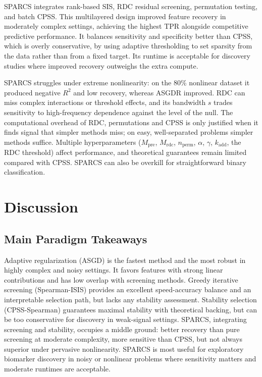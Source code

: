 \documentclass[11pt]{article}
\begin{document}
SPARCS integrates rank-based SIS, RDC residual screening, permutation testing, and batch CPSS. This
multilayered design improved feature recovery in moderately complex settings, achieving the highest
TPR alongside competitive predictive performance. It balances sensitivity and specificity better than
CPSS, which is overly conservative, by using adaptive thresholding to set sparsity from the data
rather than from a fixed target. Its runtime is acceptable for discovery studies where improved
recovery outweighs the extra compute.

SPARCS struggles under extreme nonlinearity: on the 80\% nonlinear dataset it produced negative $R^2$
and low recovery, whereas ASGDR improved. RDC can miss complex interactions or threshold effects, and
its bandwidth $s$ trades sensitivity to high-frequency dependence against the level of the null. The
computational overhead of RDC, permutations and CPSS is only justified when it finds signal that
simpler methods miss; on easy, well-separated problems simpler methods suffice. Multiple
hyperparameters ($M_{\mathrm{pre}}$, $M_{\mathrm{rdc}}$, $n_{\mathrm{perm}}$, $\alpha$, $\gamma$,
$k_{\mathrm{add}}$, the RDC threshold) affect performance, and theoretical guarantees remain limited
compared with CPSS. SPARCS can also be overkill for straightforward binary classification.

\section{Discussion}

\subsection{Main Paradigm Takeaways}

Adaptive regularization (ASGD) is the fastest method and the most robust in highly complex and noisy
settings. It favors features with strong linear contributions and has low overlap with screening
methods. Greedy iterative screening (Spearman-ISIS) provides an excellent speed-accuracy balance and
an interpretable selection path, but lacks any stability assessment. Stability selection
(CPSS-Spearman) guarantees maximal stability with theoretical backing, but can be too conservative
for discovery in weak-signal settings. SPARCS, integrating screening and stability, occupies a middle
ground: better recovery than pure screening at moderate complexity, more sensitive than CPSS, but not
always superior under pervasive nonlinearity. SPARCS is most useful for exploratory biomarker
discovery in noisy or nonlinear problems where sensitivity matters and moderate runtimes are
acceptable.
\end{document}
